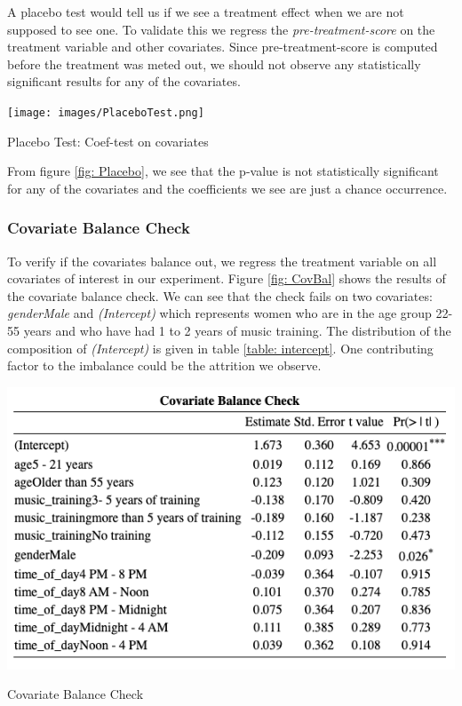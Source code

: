 \documentclass[journal,onecolumn, 12pt]{article}
\begin{document}
A placebo test would tell us if we see a treatment effect when we are not supposed to see one. To validate this we regress the \textit{pre-treatment-score} on the treatment variable and other covariates. Since pre-treatment-score is computed before the treatment was meted out, we should not observe any statistically significant results for any of the covariates. 

\begin{table}[h]
    \centering
    \texttt{[image: images/PlaceboTest.png]}
    \caption{Placebo Test: Coef-test on covariates}
    \label{fig: Placebo}
\end{table}

\noindent
From figure \ref{fig: Placebo}, we see that the p-value is not statistically significant for any of the covariates and the coefficients we see are just a chance occurrence.

\subsubsection {Covariate Balance Check}

To verify if the covariates balance out, we regress the treatment variable on all covariates of interest in our experiment. Figure \ref{fig: CovBal} shows the results of the covariate balance check. We can see that the check fails on two covariates: \textit{genderMale} and \textit{(Intercept)} which represents women who are in the age group 22- 55 years and who have had 1 to 2 years of music training. The distribution of the composition of \textit{(Intercept)} is given in table \ref{table: intercept}. One contributing factor to the imbalance could be the attrition we observe. 

\begin{table}[h]
    \centering
    \includegraphics[scale = 0.6]{images/CovBal.png}
    \caption{Covariate Balance Check}
    \label{fig: CovBal}
\end{table}
\end{document}
